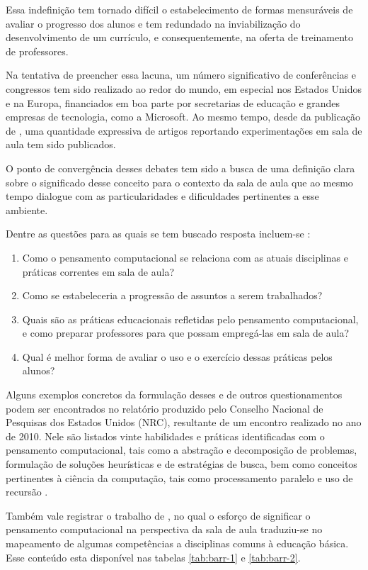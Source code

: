 Essa indefinição tem tornado difícil o estabelecimento de formas mensuráveis de avaliar o progresso dos alunos e tem redundado na inviabilização do desenvolvimento de um currículo, e consequentemente, na oferta de treinamento de professores.

Na tentativa de preencher essa lacuna, um número significativo de conferências e congressos tem sido realizado ao redor do mundo, em especial nos Estados Unidos e na Europa, financiados em boa parte por secretarias de educação e grandes empresas de tecnologia, como a Microsoft. Ao mesmo tempo, desde da publicação de , uma quantidade expressiva de artigos reportando experimentações em sala de aula tem sido publicados. 

O ponto de convergência desses debates tem sido a busca de uma definição clara sobre o significado desse conceito para o contexto da sala de aula que ao mesmo tempo dialogue com as particularidades e dificuldades pertinentes a esse ambiente.

Dentre as questões para as quais se tem buscado resposta incluem-se \cite{Weintrop2016}: 

\begin{enumerate}
  \item Como o pensamento computacional se relaciona com as atuais disciplinas e práticas correntes em sala de aula?
  \item Como se estabeleceria a progressão de assuntos a serem trabalhados? 
  \item Quais são as práticas educacionais refletidas pelo pensamento computacional, e como preparar professores para que possam empregá-las em sala de aula? 
  \item Qual é melhor forma de avaliar o uso e o exercício dessas práticas pelos alunos?
\end{enumerate}

Alguns exemplos concretos da formulação desses e de outros questionamentos podem ser encontrados no relatório produzido pelo Conselho Nacional de Pesquisas dos Estados Unidos (NRC), resultante de um encontro realizado no ano de 2010. Nele são listados vinte habilidades e práticas identificadas com o pensamento computacional, tais como a abstração e decomposição de problemas, formulação de soluções heurísticas e de estratégias de busca, bem como conceitos pertinentes à ciência da computação, tais como processamento paralelo e uso de recursão .


Também vale registrar o trabalho de , no qual o esforço de significar o pensamento computacional na perspectiva da sala de aula traduziu-se no mapeamento de algumas competências a disciplinas comuns à educação básica. Esse conteúdo esta disponível nas tabelas \ref{tab:barr-1} e \ref{tab:barr-2}.

